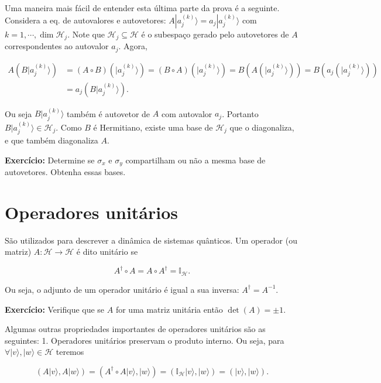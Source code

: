 \documentclass[11pt]{article}
\begin{document}
Uma maneira mais fácil de entender esta última parte da prova é a
seguinte. Considera a eq. de autovalores e autovetores:
\(A|a_{j}^{(k)}\rangle=a_{j}|a_{j}^{(k)}\rangle\) com
\(k=1,\cdots,\dim\mathcal{H}_{j}\). Note que
\(\mathcal{H}_{j}\subseteq\mathcal{H}\) é o subespaço gerado pelo
autovetores de \(A\) correspondentes ao autovalor \(a_{j}\). Agora,

\begin{align}
A(B|a_{j}^{(k)}\rangle) & = (A\circ B)(|a_{j}^{(k)}\rangle) = (B\circ A)(|a_{j}^{(k)}\rangle) =B(A(|a_{j}^{(k)}\rangle)) = B(a_{j}(|a_{j}^{(k)}\rangle)) \\
& = a_{j}(B|a_{j}^{(k)}\rangle).
\end{align}

Ou seja \(B|a_{j}^{(k)}\rangle\) também é autovetor de \(A\) com
autovalor \(a_{j}\). Portanto
\(B|a_{j}^{(k)}\rangle\in \mathcal{H}_{j}\). Como \(B\) é Hermitiano,
existe uma base de \(\mathcal{H}_{j}\) que o diagonaliza, e que também
diagonaliza \(A\).

\textbf{Exercício:} Determine se \(\sigma_{x}\) e \(\sigma_{y}\)
compartilham ou não a mesma base de autovetores. Obtenha essas bases.

    \section{Operadores unitários}\label{operadores-unituxe1rios}

São utilizados para descrever a dinâmica de sistemas quânticos. Um
operador (ou matriz) \(A:\mathcal{H}\rightarrow\mathcal{H}\) é dito
unitário se

\begin{equation}
A^{\dagger}\circ A = A\circ A^{\dagger}=\mathbb{I}_{\mathcal{H}}.
\end{equation}

Ou seja, o adjunto de um operador unitário é igual a sua inversa:
\(A^{\dagger}=A^{-1}\).

\textbf{Exercício:} Verifique que se \(A\) for uma matriz unitária então
\(\det(A)=\pm1\).

Algumas outras propriedades importantes de operadores unitários são as
seguintes: 1. Operadores unitários preservam o produto interno. Ou seja,
para \(\forall|v\rangle,|w\rangle\in\mathcal{H}\) teremos

\begin{equation}
(A|v\rangle,A|w\rangle) = (A^{\dagger}\circ A|v\rangle,|w\rangle) = (\mathbb{I}_{\mathcal{H}}|v\rangle,|w\rangle) = (|v\rangle,|w\rangle).
\end{equation}
\end{document}
